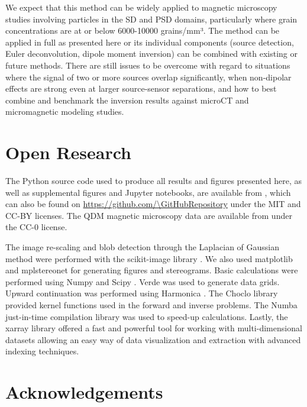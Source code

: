 We expect that this method can be widely applied to magnetic microscopy studies involving particles in the SD and PSD domains, particularly where grain concentrations are at or below 6000-10000 grains/mm³. The method can be applied in full as presented here or its individual components (source detection, Euler deconvolution, dipole moment inversion) can be combined with existing or future methods. There are still issues to be overcome with regard to situations where the signal of two or more sources overlap significantly, when non-dipolar effects are strong even at larger source-sensor separations, and how to best combine and benchmark the inversion results against microCT and micromagnetic modeling studies.

\section*{Open Research}

The Python source code used to produce all results and figures presented here, as well as supplemental figures and Jupyter notebooks, are available from \citet{sourcearchive}, which can also be found on \url{https://github.com/\GitHubRepository} under the MIT and CC-BY licenses.
The QDM magnetic microscopy data are available
from \citet{janinedata} under the CC-0 license.

The image re-scaling and blob detection through the Laplacian of Gaussian
method were performed with the scikit-image library \citep{VanderWalt2014}.
We also used matplotlib \citep{Hunter2007} and mplstereonet \citep{mplstereonet}
for generating figures and stereograms.
Basic calculations were performed using Numpy \citep{Harris2020} and Scipy
\citep{2020SciPy-NMeth}.
Verde \citep{verde2018} was used to generate data grids.
Upward continuation was performed using Harmonica \citep{harmonica2020}.
The Choclo library \citep{choclo2022} provided kernel functions used in the
forward and inverse problems.
The Numba just-in-time compilation library \citep{lam2015numba} was used to
speed-up calculations.
Lastly, the xarray library \citep{hoyer2017xarray} offered a fast and powerful
tool for working with multi-dimensional datasets allowing an easy way of data
visualization and extraction with advanced indexing techniques.


\section*{Acknowledgements}

